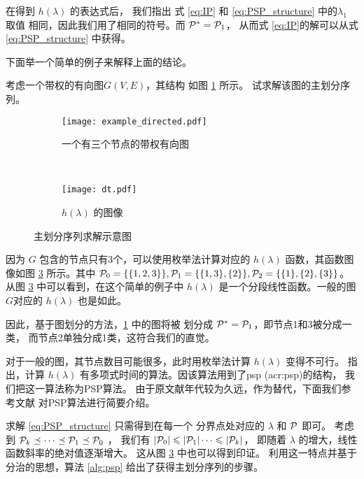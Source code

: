 在得到 $h(\lambda)$ 的表达式后，
我们指出 式 \eqref{eq:IP} 和
\eqref{eq:PSP_structure} 中的$\lambda_1$ 取值
相同，因此我们用了相同的符号。而 $\P^*=\P_1$，
从而式 \eqref{eq:IP}的解可以从式 \eqref{eq:PSP_structure}
中获得。

下面举一个简单的例子来解释上面的结论。
\begin{example}\label{ex:psp}
考虑一个带权的有向图$G(V,E)$，其结构
如图 \ref{fig:example_directed} 所示。
试求解该图的主划分序列。
\end{example}
\begin{figure}
  \centering
  \begin{subfigure}[b]{0.4\linewidth}
  \texttt{[image: example\_directed.pdf]}
  \caption{一个有三个节点的带权有向图}
  \label{fig:example_directed}
  \end{subfigure}~
  \begin{subfigure}[b]{0.5\linewidth}
    \texttt{[image: dt.pdf]}
    \caption{$h(\lambda)$ 的图像}
    \label{fig:dt}
    \end{subfigure}  
    \caption{主划分序列求解示意图}
\end{figure}

因为
$G$ 包含的节点只有3个，可以使用枚举法计算对应的 $h(\lambda)$
函数，其函数图像如图 \ref{fig:dt} 所示。其中
$\P_0=\{ \{1,2,3\} \}, \P_1 = \{\{1,3\}, \{2\} \},
\P_2 =\{\{1\},\{2\},\{3\} \}$。
从图 \ref{fig:dt} 中可以看到，在这个简单的例子中
$h(\lambda)$
是一个分段线性函数。一般的图$G$对应的
$h(\lambda)$ 也是如此。

因此，基于图划分的方法，\ref{fig:example_directed}
中的图将被 划分成 $\P^*=\P_1$，即节点1和3被分成一类，
而节点2单独分成1类，这符合我们的直觉。

对于一般的图，其节点数目可能很多，此时用枚举法计算
$h(\lambda)$ 变得不可行。\citet{narayanan} 指出，计算
$h(\lambda)$ 有多项式时间的算法。因该算法用到了\gls{psp} (\gls{acr:psp})的结构，
我们把这一算法称为PSP算法。
由于原文献年代较为久远，作为替代，下面我们参考文献
对PSP算法进行简要介绍。

求解 \eqref{eq:PSP_structure} 只需得到在每一个
分界点处对应的 $\lambda$ 和 $\P$ 即可。
考虑到 $\P_k \preceq \dots \preceq \P_1 \preceq \P_0$
，
我们有 $|\P_0| \leq |\P_1| \dots \leq |\P_k|$，
即随着 $\lambda $ 的增大，线性函数斜率的绝对值逐渐增大。
这从图 \ref{fig:dt} 中也可以得到印证。
利用这一特点并基于分治的思想，算法 \ref{alg:psp} 
给出了获得主划分序列的步骤。

